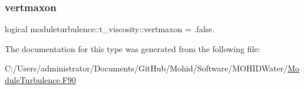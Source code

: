 \subsubsection{\texorpdfstring{vertmaxon}{vertmaxon}}
{\footnotesize\ttfamily logical moduleturbulence\+::t\+\_\+viscosity\+::vertmaxon = .false.\hspace{0.3cm}{\ttfamily [private]}}



The documentation for this type was generated from the following file\+:\begin{DoxyCompactItemize}
\item 
C\+:/\+Users/administrator/\+Documents/\+Git\+Hub/\+Mohid/\+Software/\+M\+O\+H\+I\+D\+Water/\mbox{\hyperlink{_module_turbulence_8_f90}{Module\+Turbulence.\+F90}}\end{DoxyCompactItemize}
